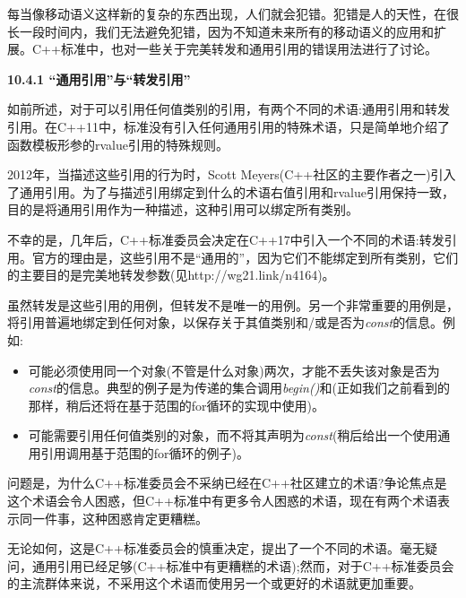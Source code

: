 每当像移动语义这样新的复杂的东西出现，人们就会犯错。犯错是人的天性，在很长一段时间内，我们无法避免犯错，因为不知道未来所有的移动语义的应用和扩展。C++标准中，也对一些关于完美转发和通用引用的错误用法进行了讨论。\par

\hspace*{\fill} \par %
\textbf{10.4.1 “通用引用”与“转发引用”}

如前所述，对于可以引用任何值类别的引用，有两个不同的术语:通用引用和转发引用。在C++11中，标准没有引入任何通用引用的特殊术语，只是简单地介绍了函数模板形参的rvalue引用的特殊规则。\par

2012年，当描述这些引用的行为时，Scott Meyers(C++社区的主要作者之一)引入了通用引用。为了与描述引用绑定到什么的术语右值引用和rvalue引用保持一致，目的是将通用引用作为一种描述，这种引用可以绑定所有类别。\par

不幸的是，几年后，C++标准委员会决定在C++17中引入一个不同的术语:转发引用。官方的理由是，这些引用不是“通用的”，因为它们不能绑定到所有类别，它们的主要目的是完美地转发参数(见http://wg21.link/n4164)。\par

虽然转发是这些引用的用例，但转发不是唯一的用例。另一个非常重要的用例是，将引用普遍地绑定到任何对象，以保存关于其值类别和/或是否为\textit{const}的信息。例如:\par

\begin{itemize}
	\item 可能必须使用同一个对象(不管是什么对象)两次，才能不丢失该对象是否为\textit{const}的信息。典型的例子是为传递的集合调用\textit{begin()}和\textit{}(正如我们之前看到的那样，稍后还将在基于范围的for循环的实现中使用)。
	\item 可能需要引用任何值类别的对象，而不将其声明为\textit{const}(稍后给出一个使用通用引用调用基于范围的for循环的例子)。
\end{itemize}

问题是，为什么C++标准委员会不采纳已经在C++社区建立的术语?争论焦点是这个术语会令人困惑，但C++标准中有更多令人困惑的术语，现在有两个术语表示同一件事，这种困惑肯定更糟糕。\par

无论如何，这是C++标准委员会的慎重决定，提出了一个不同的术语。毫无疑问，通用引用已经足够(C++标准中有更糟糕的术语);然而，对于C++标准委员会的主流群体来说，不采用这个术语而使用另一个或更好的术语就更加重要。\par

